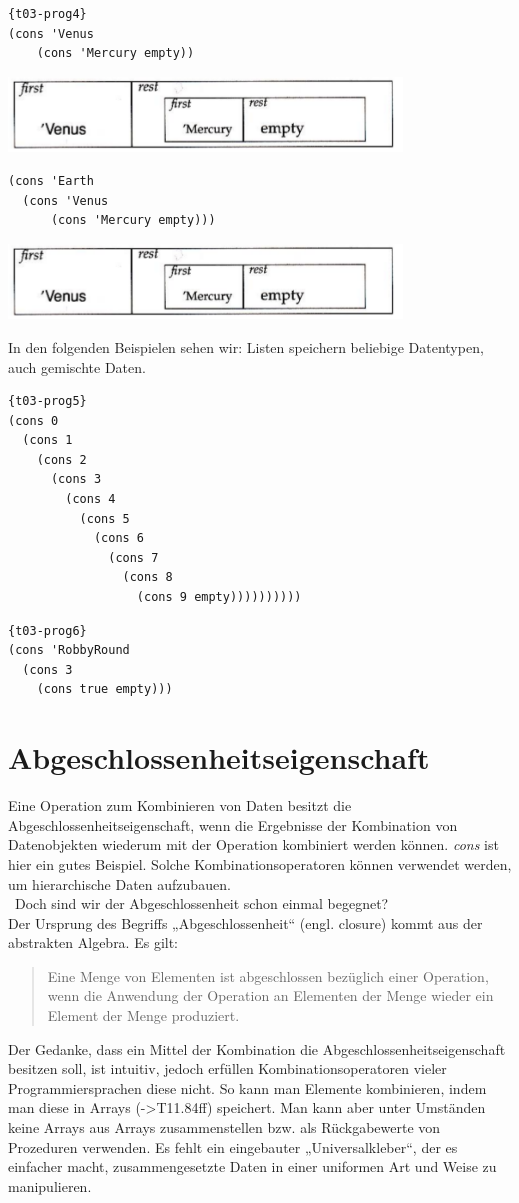 \begin{lstlisting}{t03-prog4}
(cons 'Venus
    (cons 'Mercury empty))
\end{lstlisting}
\includegraphics[height=2cm]{Bilder/T03_01.png}

\begin{lstlisting}
(cons 'Earth
  (cons 'Venus
	  (cons 'Mercury empty)))
\end{lstlisting}
\includegraphics[height=2cm]{Bilder/T03_01.png}

In den folgenden Beispielen sehen wir: Listen speichern beliebige Datentypen, auch gemischte Daten.

\begin{lstlisting}{t03-prog5}
(cons 0
  (cons 1
    (cons 2
      (cons 3
        (cons 4
      	  (cons 5
            (cons 6
              (cons 7
                (cons 8
                  (cons 9 empty))))))))))
\end{lstlisting}

\begin{lstlisting}{t03-prog6}
(cons 'RobbyRound
  (cons 3
    (cons true empty)))
\end{lstlisting}
\section{Abgeschlossenheitseigenschaft}
Eine Operation zum Kombinieren von Daten besitzt die Abgeschlossenheitseigenschaft, wenn die Ergebnisse der Kombination von Datenobjekten wiederum mit der Operation kombiniert werden können.  \textit{cons} ist hier ein gutes Beispiel. Solche Kombinationsoperatoren können verwendet werden, um hierarchische Daten aufzubauen. \\\
Doch sind wir der Abgeschlossenheit schon einmal begegnet?\\
Der Ursprung des Begriffs „Abgeschlossenheit“ (engl. closure) kommt aus der abstrakten Algebra. Es gilt:
\begin{quote}
	Eine Menge von Elementen ist abgeschlossen bezüglich einer Operation, wenn die Anwendung der Operation an Elementen der Menge wieder ein Element der Menge produziert.
\end{quote}
Der Gedanke, dass ein Mittel der Kombination die Abgeschlossenheitseigenschaft besitzen soll, ist intuitiv, jedoch erfüllen Kombinationsoperatoren vieler Programmiersprachen diese nicht. So kann man Elemente kombinieren, indem man diese in Arrays (->T11.84ff) speichert. Man kann aber unter Umständen keine Arrays aus Arrays zusammenstellen bzw. als Rückgabewerte von Prozeduren verwenden. Es fehlt ein eingebauter „Universalkleber“, der es einfacher macht, zusammengesetzte Daten in einer uniformen Art und Weise zu manipulieren.

